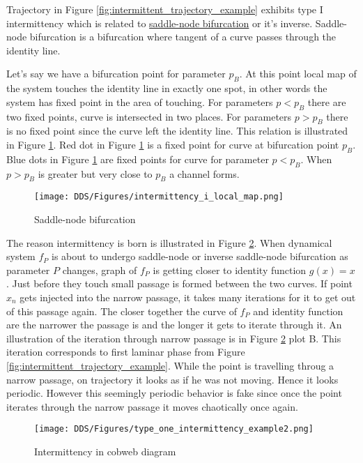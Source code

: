 Trajectory in Figure \ref{fig:intermittent_trajectory_example} exhibits type I intermittency which is related to \hyperref[def:saddle_node_bif]{saddle-node bifurcation} or it's inverse.
Saddle-node bifurcation is a bifurcation where tangent of a curve passes through the identity line.
\par
Let's say we have a bifurcation point for parameter $p_{B}$.
At this point local map of the system touches the identity line in exactly one spot, in other words the system has fixed point in the area of touching.
For parameters $p < p_{B}$ there are two fixed points, curve is intersected in two places.
For parameters $p > p_{B}$ there is no fixed point since the curve left the identity line.
This relation is illustrated in Figure \ref{fig:saddle_node_bifurcation}.
Red dot in Figure \ref{fig:saddle_node_bifurcation} is a fixed point for curve at bifurcation point $p_{B}$.
Blue dots in Figure \ref{fig:saddle_node_bifurcation} are fixed points for curve for parameter $p < p_{B}$.
When $p > p_{B}$ is greater but very close to $p_{B}$ a channel forms.
\begin{figure}[!h]
    \centering
    \texttt{[image: DDS/Figures/intermittency\_i\_local\_map.png]}
    \caption{Saddle-node bifurcation}
    \label{fig:saddle_node_bifurcation}
\end{figure}


The reason intermittency is born is illustrated in Figure \ref{fig:intermittent_cobweb_example}.
When dynamical system $f_P$ is about to undergo saddle-node or inverse saddle-node bifurcation as parameter $P$ changes, graph of $f_P$ is getting closer to identity function $g(x)=x$.
Just before they touch small passage is formed between the two curves.
If point $x_n$ gets injected into the narrow passage, it takes many iterations for it to get out of this passage again.
The closer together the curve of $f_P$ and identity function are the narrower the passage is and the longer it gets to iterate through it.
An illustration of the iteration through narrow passage is in Figure \ref{fig:intermittent_cobweb_example} plot B.
This iteration corresponds to first laminar phase from Figure \ref{fig:intermittent_trajectory_example}.
While the point is travelling throug a narrow passage, on trajectory it looks as if he was not moving.
Hence it looks periodic.
However this seemingly periodic behavior is fake since once the point iterates through the narrow passage it moves chaotically once again.

\begin{figure}[!h]
    \centering
    \texttt{[image: DDS/Figures/type\_one\_intermittency\_example2.png]}
    \caption{Intermittency in cobweb diagram}
    \label{fig:intermittent_cobweb_example}
\end{figure}

